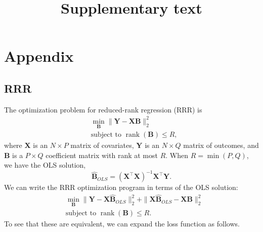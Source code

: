 \documentclass{bmcart}
\DeclareMathOperator{\rank}{rank}
\begin{document}
\title{Supplementary text}
\date{\vspace{-3ex}}
\maketitle

\section*{Appendix}
\subsection{RRR}
The optimization problem for reduced-rank regression (RRR) is
\begin{align*}
    &\min_{\mathbf{B}} \|\mathbf{Y} - \mathbf{X}\mathbf{B}\|_2^2 \\
    &\text{subject to } \rank(\mathbf{B}) \leq R,
\end{align*}
where $\mathbf{X}$ is an $N \times P$ matrix of covariates, $\mathbf{Y}$ is an $N \times Q$ matrix of outcomes, and $\mathbf{B}$ is a $P \times Q$ coefficient matrix with rank at most $R$. When $R=\min(P, Q)$, we have the OLS solution,
\begin{equation*}
    \widehat{\mathbf{B}}_{OLS}=(\mathbf{X}^\top \mathbf{X})^{-1} \mathbf{X}^\top \mathbf{Y}.
\end{equation*}
We can write the RRR optimization program in terms of the OLS solution:
\begin{align}\label{eq:rrr_ols}
    &\min_\mathbf{B} \|\mathbf{Y} - \mathbf{X}\widehat{\mathbf{B}}_{OLS}\|_2^2 + \|\mathbf{X} \widehat{\mathbf{B}}_{OLS} - \mathbf{X}\mathbf{B}\|_2^2 \\ 
    &\text{subject to } \rank(\mathbf{B}) \leq R. \nonumber
\end{align}
To see that these are equivalent, we can expand the loss function as follows.
\end{document}
